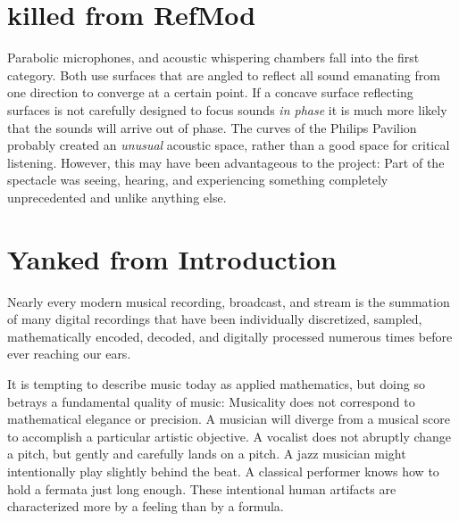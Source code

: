 \section{killed from RefMod}
Parabolic microphones\cite{Davis1989}, and acoustic whispering
chambers fall into the
first category. Both use surfaces that are angled to reflect all sound
emanating from one direction to converge at a certain point. If a
concave surface reflecting surfaces is not carefully designed to focus
sounds \textit{in phase} it is much more likely that the sounds will
arrive out of phase. The curves of the Philips Pavilion probably
created an \emph{unusual} acoustic space, rather than a good space for
critical listening. However, this may have been advantageous to the
project: Part of the spectacle was seeing, hearing, and experiencing
something completely unprecedented and unlike anything else.

\section{Yanked from Introduction}
\label{sec:yank-from-intr}

Nearly every modern musical recording, broadcast, and stream is the
summation of many digital recordings that have been individually
discretized, sampled, mathematically encoded, decoded, and digitally
processed numerous times before ever reaching our ears.\cite{Case2007}

It is tempting to describe music today as applied mathematics, but
doing so betrays a fundamental quality of music: Musicality does not
correspond to mathematical elegance or precision. A musician will
diverge from a musical score to accomplish a particular artistic
objective. A vocalist does not abruptly change a pitch, but gently and
carefully lands on a pitch. A jazz musician might intentionally play
slightly behind the beat. A classical performer knows how to hold a
fermata just long enough. These intentional human artifacts are
characterized more by a feeling than by a formula.

